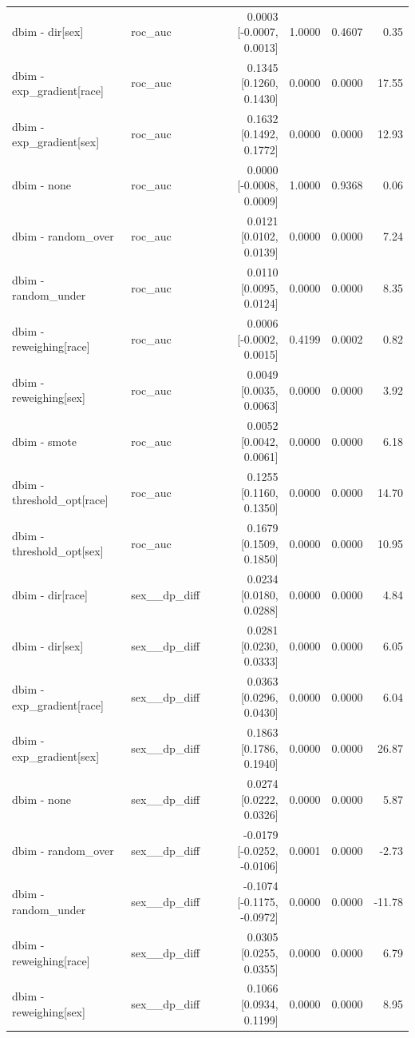 \begin{table}[t]
{\begin{tabular}{llrrrr}
dbim - dir[sex] & roc\_auc & 0.0003 [-0.0007, 0.0013] & 1.0000 & 0.4607 & 0.35 \\
dbim - exp\_gradient[race] & roc\_auc & 0.1345 [0.1260, 0.1430] & 0.0000 & 0.0000 & 17.55 \\
dbim - exp\_gradient[sex] & roc\_auc & 0.1632 [0.1492, 0.1772] & 0.0000 & 0.0000 & 12.93 \\
dbim - none & roc\_auc & 0.0000 [-0.0008, 0.0009] & 1.0000 & 0.9368 & 0.06 \\
dbim - random\_over & roc\_auc & 0.0121 [0.0102, 0.0139] & 0.0000 & 0.0000 & 7.24 \\
dbim - random\_under & roc\_auc & 0.0110 [0.0095, 0.0124] & 0.0000 & 0.0000 & 8.35 \\
dbim - reweighing[race] & roc\_auc & 0.0006 [-0.0002, 0.0015] & 0.4199 & 0.0002 & 0.82 \\
dbim - reweighing[sex] & roc\_auc & 0.0049 [0.0035, 0.0063] & 0.0000 & 0.0000 & 3.92 \\
dbim - smote & roc\_auc & 0.0052 [0.0042, 0.0061] & 0.0000 & 0.0000 & 6.18 \\
dbim - threshold\_opt[race] & roc\_auc & 0.1255 [0.1160, 0.1350] & 0.0000 & 0.0000 & 14.70 \\
dbim - threshold\_opt[sex] & roc\_auc & 0.1679 [0.1509, 0.1850] & 0.0000 & 0.0000 & 10.95 \\
dbim - dir[race] & sex\_\_dp\_diff & 0.0234 [0.0180, 0.0288] & 0.0000 & 0.0000 & 4.84 \\
dbim - dir[sex] & sex\_\_dp\_diff & 0.0281 [0.0230, 0.0333] & 0.0000 & 0.0000 & 6.05 \\
dbim - exp\_gradient[race] & sex\_\_dp\_diff & 0.0363 [0.0296, 0.0430] & 0.0000 & 0.0000 & 6.04 \\
dbim - exp\_gradient[sex] & sex\_\_dp\_diff & 0.1863 [0.1786, 0.1940] & 0.0000 & 0.0000 & 26.87 \\
dbim - none & sex\_\_dp\_diff & 0.0274 [0.0222, 0.0326] & 0.0000 & 0.0000 & 5.87 \\
dbim - random\_over & sex\_\_dp\_diff & -0.0179 [-0.0252, -0.0106] & 0.0001 & 0.0000 & -2.73 \\
dbim - random\_under & sex\_\_dp\_diff & -0.1074 [-0.1175, -0.0972] & 0.0000 & 0.0000 & -11.78 \\
dbim - reweighing[race] & sex\_\_dp\_diff & 0.0305 [0.0255, 0.0355] & 0.0000 & 0.0000 & 6.79 \\
dbim - reweighing[sex] & sex\_\_dp\_diff & 0.1066 [0.0934, 0.1199] & 0.0000 & 0.0000 & 8.95 \\

\end{tabular}}
\end{table}
